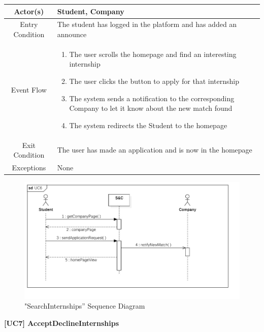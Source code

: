 \documentclass{article}
\begin{document}
\begin{table}[H]
    \centering
    \begin{tabular}{|c|p{10cm}|}
    \hline
        Actor(s)  & Student, Company\\ 
    \hline
        Entry Condition &  
        The student has logged in the platform and has added an announce\\
    \hline
        Event Flow &
        \begin{enumerate}
            \item The user scrolls the homepage and find an interesting internship
            \item The user clicks the button to apply for that internship
            \item The system sends a notification to the corresponding Company to let it know about the new match found
            \item The system redirects the Student to the homepage
        \end{enumerate}
        \\
    \hline
        Exit Condition & The user has made an application and is now in the homepage\\
    \hline
        Exceptions &  None\\
    \hline
    \end{tabular}
    \label{tab:my_label}
\end{table}
\begin{figure}[H]
    \centering
    \includegraphics[width=1\linewidth]{sequenceDiagrams/UC6.jpg}
    \caption{"SearchInternships” Sequence Diagram}
    \label{fig:enter-label}
\end{figure}
\vspace{1cm}
\textbf{[UC7] AcceptDeclineInternships}
\end{document}
